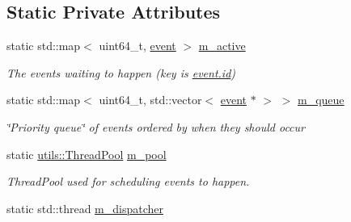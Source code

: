 \subsection*{Static Private Attributes}
\begin{DoxyCompactItemize}
\item 
\mbox{\label{classnta_1_1CallbackManager_a03df001cff1afcc19ed4bb35cd51b5d0}} 
static std\+::map$<$ uint64\+\_\+t, \hyperlink{classnta_1_1CallbackManager_d3/dc5/structnta_1_1CallbackManager_1_1event}{event} $>$ \hyperlink{classnta_1_1CallbackManager_a03df001cff1afcc19ed4bb35cd51b5d0}{m\+\_\+active}
\begin{DoxyCompactList}\small\item\em The events waiting to happen (key is \hyperlink{classnta_1_1CallbackManager_a743978e02001b9ceff1145c41214d2e5}{event.\+id}) \end{DoxyCompactList}\item 
\mbox{\label{classnta_1_1CallbackManager_af348c39ad7b27a0f8c92e4b90bf944a7}} 
static std\+::map$<$ uint64\+\_\+t, std\+::vector$<$ \hyperlink{classnta_1_1CallbackManager_d3/dc5/structnta_1_1CallbackManager_1_1event}{event} $\ast$ $>$ $>$ \hyperlink{classnta_1_1CallbackManager_af348c39ad7b27a0f8c92e4b90bf944a7}{m\+\_\+queue}
\begin{DoxyCompactList}\small\item\em \char`\"{}\+Priority queue\char`\"{} of events ordered by when they should occur \end{DoxyCompactList}\item 
\mbox{\label{classnta_1_1CallbackManager_a4bdfb67cfd791112b1e83159862eefa0}} 
static \hyperlink{classnta_1_1utils_1_1ThreadPool}{utils\+::\+Thread\+Pool} \hyperlink{classnta_1_1CallbackManager_a4bdfb67cfd791112b1e83159862eefa0}{m\+\_\+pool}
\begin{DoxyCompactList}\small\item\em Thread\+Pool used for scheduling events to happen. \end{DoxyCompactList}\item 
\mbox{\label{classnta_1_1CallbackManager_abc47b7e18fc1576edb799be131baf116}} 
static std\+::thread \hyperlink{classnta_1_1CallbackManager_abc47b7e18fc1576edb799be131baf116}{m\+\_\+dispatcher}

\end{DoxyCompactItemize}
